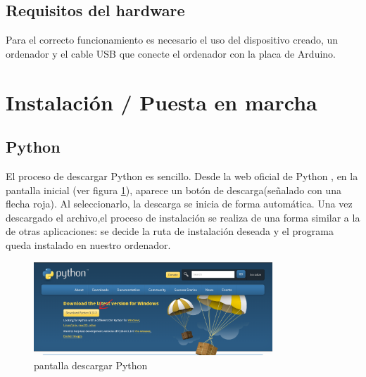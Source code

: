 \subsection{Requisitos del hardware}
Para el correcto funcionamiento es necesario el uso del dispositivo creado, un ordenador y el cable USB que conecte el ordenador con la placa de Arduino.
\section{Instalación / Puesta en marcha}
\subsection{Python}

El proceso de descargar Python es sencillo. Desde la web oficial de Python \cite{Python}, en la pantalla inicial (ver figura \ref{fig:Python}), aparece un botón de descarga(señalado con una flecha roja). Al seleccionarlo, la descarga se inicia de forma  automática. Una vez descargado el archivo,el proceso de instalación se realiza de una forma similar a la de otras aplicaciones: se decide la ruta de instalación deseada y el programa queda instalado en nuestro ordenador.

\begin{figure}[h]
        \centering
        \includegraphics[width=0.8\textwidth]{img/pantalla inicio python.png}
        \caption{pantalla descargar Python}
        \label{fig:Python}
    \end{figure}
